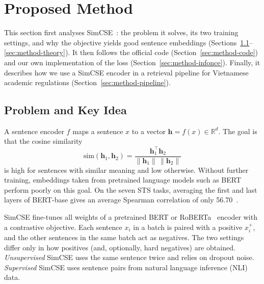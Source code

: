 \section{Proposed Method}
\label{sec:method}

This section first analyses SimCSE~\cite{gao-etal-2021-simcse}: the problem it
solves, its two training settings, and why the objective yields good sentence
embeddings (Sections~\ref{sec:method-problem}--\ref{sec:method-theory}). It then
follows the official code (Section~\ref{sec:method-code}) and our own
implementation of the loss (Section~\ref{sec:method-infonce}). Finally, it
describes how we use a SimCSE encoder in a retrieval pipeline for Vietnamese
academic regulations (Section~\ref{sec:method-pipeline}).

\subsection{Problem and Key Idea}
\label{sec:method-problem}

A sentence encoder $f$ maps a sentence $x$ to a vector
$\mathbf{h}=f(x)\in\mathbb{R}^d$. The goal is that the cosine similarity
\begin{equation}
\mathrm{sim}(\mathbf{h}_1,\mathbf{h}_2)
  = \frac{\mathbf{h}_1^\top\mathbf{h}_2}{\lVert\mathbf{h}_1\rVert\,\lVert\mathbf{h}_2\rVert}
\end{equation}
is high for sentences with similar meaning and low otherwise. Without further
training, embeddings taken from pretrained language models such as
BERT~\cite{devlin-etal-2019-bert} perform poorly on this goal. On the seven STS
tasks, averaging the first and last layers of BERT-base gives an average
Spearman correlation of only 56.70~\cite{gao-etal-2021-simcse}.

SimCSE fine-tunes all weights of a pretrained BERT or
RoBERTa~\cite{liu2019robertarobustlyoptimizedbert} encoder with a contrastive
objective. Each sentence $x_i$ in a batch is paired with a positive $x_i^+$,
and the other sentences in the same batch act as negatives. The two settings
differ only in how positives (and, optionally, hard negatives) are obtained.
\emph{Unsupervised} SimCSE uses the same sentence twice and relies on dropout
noise. \emph{Supervised} SimCSE uses sentence pairs from natural language
inference (NLI) data.

